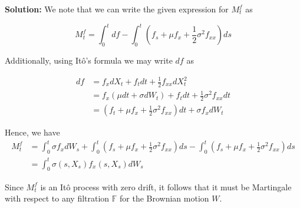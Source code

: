 \documentclass[12pt, a4paper]{article}
\begin{document}
\begin{enumerate}
\textbf{Solution:} We note that we can write the given expression for $M_t^f$ as 

$$M_t^f = \int_0^t df - \int_0^t \left( f_s + \mu f_x + \frac{1}{2} \sigma^2 f_{xx}\right)ds$$

Additionally, using Itô's formula we may write $df$ as 

\begin{align*}
    df &= f_x dX_t + f_t dt + \frac{1}{2} f_{xx} dX_t^2\\
    &= f_x(\mu dt + \sigma dW_t) + f_t dt + \frac{1}{2} \sigma^2  f_{xx}dt\\
    &= \left(f_t + \mu f_x + \frac{1}{2} \sigma^2 f_{xx}\right)dt + \sigma f_x dW_t
\end{align*}

Hence, we have
\begin{align*}
    M_t^f &= \int_0^t \sigma f_x dW_s + \int_0^t \left(f_s + \mu f_x + \frac{1}{2} \sigma^2 f_{xx}\right)ds - \int_0^t \left( f_s + \mu f_x + \frac{1}{2} \sigma^2 f_{xx}\right)ds\\
    &= \int_0^t \sigma(s, X_s) f_x(s, X_s) dW_s
\end{align*}

Since $M_t^f$ is an Itô process with zero drift, it follows that it must be Martingale with respect to any filtration $\mathbb{F}$ for the Brownian motion $W$. 

\end{enumerate}
\end{document}
